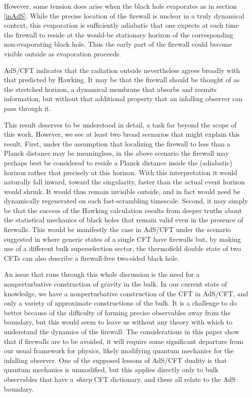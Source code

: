 \documentclass[12pt]{article}
\begin{document}
{However, some tension does arise when the black hole evaporates as in section \ref{inAdS}.  While the precise location of the firewall is unclear in a truly dynamical context, this evaporation is sufficiently adiabatic that one expects at each time the firewall to reside at the would-be stationary horizon of the corresponding non-evaporating black hole.  Thus the early part of the firewall could become visible outside as evaporation proceeds.

AdS/CFT indicates that the radiation outside nevertheless agrees broadly with that predicted by Hawking.  {It may be that the firewall should be thought of as the stretched horizon, a dynamical membrane that absorbs and reemits information, but without that additional property that an infalling observer can pass through it.}

This result deserves to be understood in detail, a task far beyond the scope of this work.  However, we see at least two broad scenarios that might explain this result.  First, under the assumption that localizing the firewall to less than a Planck distance may be meaningless, in the above scenario the firewall may perhaps best be considered to reside a Planck distance inside the (adiabatic) horizon rather that precisely at this horizon.  With this interpretation it would naturally fall inward, toward the singularity, faster than the actual event horizon would shrink.  It would thus remain invisible outside, and in fact would need be dynamically regenerated on each fast-scrambling timescale.  Second, it may simply be that the success of the Hawking calculation results from deeper truths about the statistical mechanics of black holes that remain valid even in the presence of firewalls.  {This would be manifestly the case in AdS/CFT under the scenario suggested in \cite{Marolf:2012xe} where generic states of a single CFT have firewalls but, by making use of a different bulk superselection sector, the thermofield double state of two CFTs can also describe a firewall-free two-sided black hole.}

An issue that runs through this whole discussion is the need for a nonperturbative construction of gravity in the bulk.  In our current state of knowledge, we have a nonperturbative construction of the CFT in AdS/CFT, and only a variety of approximate constructions of the bulk.  It is a challenge to do better because of the difficulty of forming precise observables away from the boundary, but this would seem to leave us without any theory with which to understand the dynamics of the firewall.  The considerations in this paper show that if firewalls are to be avoided, it will require some significant departure from our usual framework for physics, likely modifying quantum mechanics for the infalling observer.  One of the supposed lessons of AdS/CFT duality is that quantum mechanics is unmodified, but this applies directly only to bulk observables that have a {\it sharp} CFT dictionary, and these all relate to the AdS boundary.

}
\end{document}
